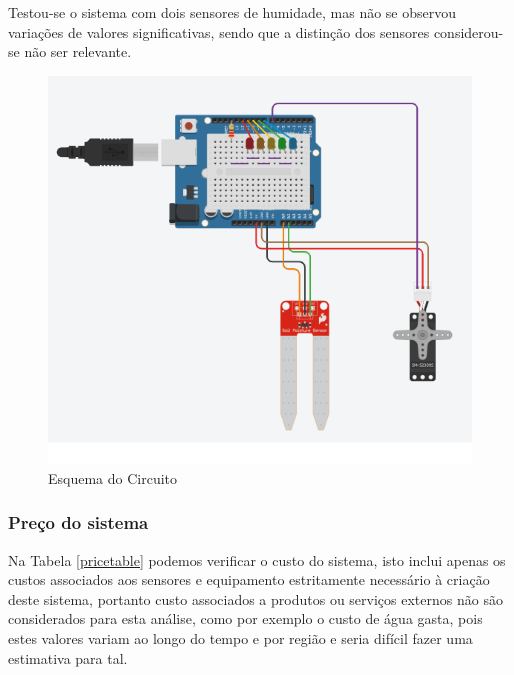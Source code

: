 \documentclass[conference]{IEEEtran}
\begin{document}
Testou-se o sistema com dois sensores de humidade, mas não se observou variações de valores significativas, 
sendo que a distinção dos sensores considerou-se não ser relevante.

\begin{figure}
    \centering
    \includegraphics[scale=0.5]{soil-moisture-circuit-schema.png}
    \caption{Esquema do Circuito}
    \label{fig:circuit}
\end{figure}

\subsubsection{Preço do sistema}

Na Tabela \ref{pricetable} podemos verificar o custo do sistema, 
isto inclui apenas os custos associados aos sensores e equipamento 
estritamente necessário à criação deste sistema, portanto custo associados 
a produtos ou serviços externos não são considerados para esta análise, 
como por exemplo o custo de água gasta, pois estes valores variam ao longo 
do tempo e por região e seria difícil fazer uma estimativa para tal.
\end{document}
